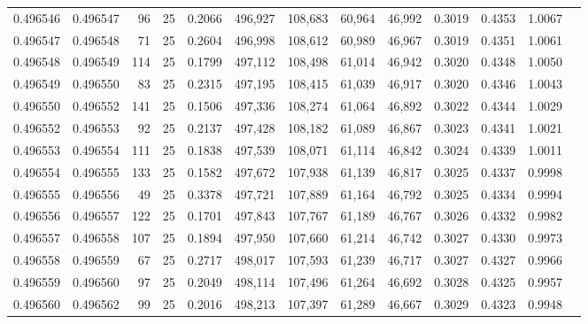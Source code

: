 \begin{tabular}{rrrrrrrrrrrrr}
0.496546 & 0.496547 &    96 &  25 &                                     0.2066 & 496,927 & 108,683 &  60,964 &  46,992 & 0.3019 & 0.4353 & 1.0067 \\
0.496547 & 0.496548 &    71 &  25 &                                     0.2604 & 496,998 & 108,612 &  60,989 &  46,967 & 0.3019 & 0.4351 & 1.0061 \\
0.496548 & 0.496549 &   114 &  25 &                                     0.1799 & 497,112 & 108,498 &  61,014 &  46,942 & 0.3020 & 0.4348 & 1.0050 \\
0.496549 & 0.496550 &    83 &  25 &                                     0.2315 & 497,195 & 108,415 &  61,039 &  46,917 & 0.3020 & 0.4346 & 1.0043 \\
0.496550 & 0.496552 &   141 &  25 &                                     0.1506 & 497,336 & 108,274 &  61,064 &  46,892 & 0.3022 & 0.4344 & 1.0029 \\
0.496552 & 0.496553 &    92 &  25 &                                     0.2137 & 497,428 & 108,182 &  61,089 &  46,867 & 0.3023 & 0.4341 & 1.0021 \\
0.496553 & 0.496554 &   111 &  25 &                                     0.1838 & 497,539 & 108,071 &  61,114 &  46,842 & 0.3024 & 0.4339 & 1.0011 \\
0.496554 & 0.496555 &   133 &  25 &                                     0.1582 & 497,672 & 107,938 &  61,139 &  46,817 & 0.3025 & 0.4337 & 0.9998 \\
0.496555 & 0.496556 &    49 &  25 &                                     0.3378 & 497,721 & 107,889 &  61,164 &  46,792 & 0.3025 & 0.4334 & 0.9994 \\
0.496556 & 0.496557 &   122 &  25 &                                     0.1701 & 497,843 & 107,767 &  61,189 &  46,767 & 0.3026 & 0.4332 & 0.9982 \\
0.496557 & 0.496558 &   107 &  25 &                                     0.1894 & 497,950 & 107,660 &  61,214 &  46,742 & 0.3027 & 0.4330 & 0.9973 \\
0.496558 & 0.496559 &    67 &  25 &                                     0.2717 & 498,017 & 107,593 &  61,239 &  46,717 & 0.3027 & 0.4327 & 0.9966 \\
0.496559 & 0.496560 &    97 &  25 &                                     0.2049 & 498,114 & 107,496 &  61,264 &  46,692 & 0.3028 & 0.4325 & 0.9957 \\
0.496560 & 0.496562 &    99 &  25 &                                     0.2016 & 498,213 & 107,397 &  61,289 &  46,667 & 0.3029 & 0.4323 & 0.9948 \\

\end{tabular}
